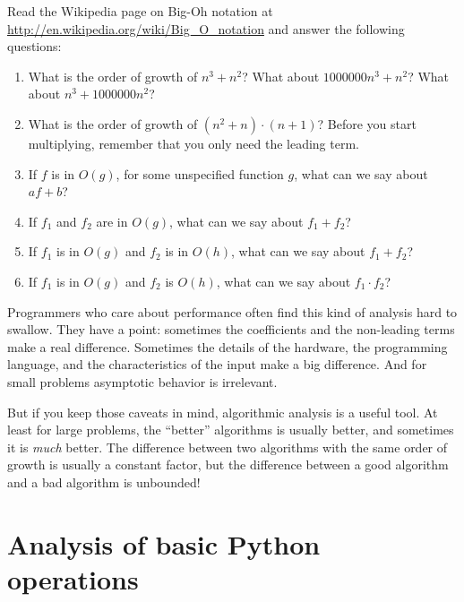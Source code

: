 \documentclass[10pt]{book}
\begin{document}
\begin{exercise}

Read the Wikipedia page on Big-Oh notation at
\url{http://en.wikipedia.org/wiki/Big_O_notation} and
answer the following questions:

\begin{enumerate}
\item What is the order of growth of $n^3 + n^2$?
What about $1000000 n^3 + n^2$?
What about $n^3 + 1000000 n^2$?

\item What is the order of growth of $(n^2 + n) \cdot (n + 1)$?  Before
  you start multiplying, remember that you only need the leading term.

\item If $f$ is in $O(g)$, for some unspecified function $g$, what can
  we say about $af+b$?

\item If $f_1$ and $f_2$ are in $O(g)$, what can we say about $f_1 + f_2$?

\item If  $f_1$ is in $O(g)$
and $f_2$ is in $O(h)$,
what can we say about  $f_1 + f_2$?

\item If  $f_1$ is in $O(g)$ and $f_2$ is $O(h)$,
what can we say about  $f_1 \cdot f_2$?
\end{enumerate}

\end{exercise}

Programmers who care about performance often find this kind of
analysis hard to swallow.  They have a point: sometimes the
coefficients and the non-leading terms make a real difference.
Sometimes the details of the hardware, the programming language, and
the characteristics of the input make a big difference.  And for small
problems asymptotic behavior is irrelevant.

But if you keep those caveats in mind, algorithmic analysis is a
useful tool.  At least for large problems, the ``better'' algorithms
is usually better, and sometimes it is {\em much} better.  The
difference between two algorithms with the same order of growth is
usually a constant factor, but the difference between a good algorithm
and a bad algorithm is unbounded!


\section{Analysis of basic Python operations}
\end{document}
